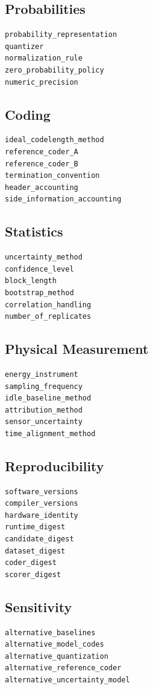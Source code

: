 \documentclass[11pt]{article}
\begin{document}
\subsection{Probabilities}
\begin{verbatim}
probability_representation
quantizer
normalization_rule
zero_probability_policy
numeric_precision
\end{verbatim}

\subsection{Coding}
\begin{verbatim}
ideal_codelength_method
reference_coder_A
reference_coder_B
termination_convention
header_accounting
side_information_accounting
\end{verbatim}

\subsection{Statistics}
\begin{verbatim}
uncertainty_method
confidence_level
block_length
bootstrap_method
correlation_handling
number_of_replicates
\end{verbatim}

\subsection{Physical Measurement}
\begin{verbatim}
energy_instrument
sampling_frequency
idle_baseline_method
attribution_method
sensor_uncertainty
time_alignment_method
\end{verbatim}

\subsection{Reproducibility}
\begin{verbatim}
software_versions
compiler_versions
hardware_identity
runtime_digest
candidate_digest
dataset_digest
coder_digest
scorer_digest
\end{verbatim}

\subsection{Sensitivity}
\begin{verbatim}
alternative_baselines
alternative_model_codes
alternative_quantization
alternative_reference_coder
alternative_uncertainty_model
\end{verbatim}
\end{document}
